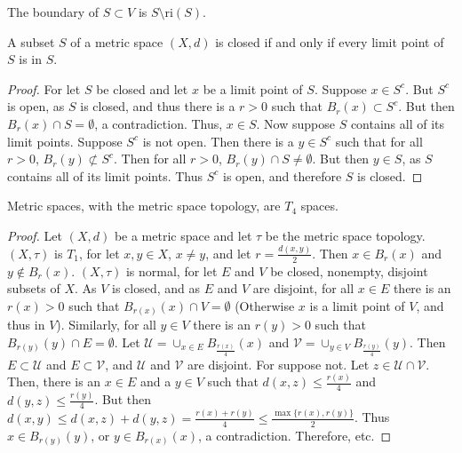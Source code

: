 \documentclass[crop=false,class=article,oneside]{standalone}
\begin{document}
            \begin{definition}
            The boundary of $S\subset V$ is $S\setminus \textrm{ri}(S)$.
            \end{definition}
            \begin{theorem}
            A subset $S$ of a metric space $(X,d)$ is closed if and only if every limit point of $S$ is in $S$.
            \end{theorem}
            \begin{proof}
            For let $S$ be closed and let $x$ be a limit point of $S$. Suppose $x\in S^c$. But $S^c$ is open, as $S$ is closed, and thus there is a $r>0$ such that $B_{r}(x)\subset S^c$. But then $B_{r}(x)\cap S = \emptyset$, a contradiction. Thus, $x\in S$. Now suppose $S$ contains all of its limit points. Suppose $S^c$ is not open. Then there is a $y\in S^c$ such that for all $r>0$, $B_{r}(y)\not \subset S^c$. Then for all $r>0$, $B_{r}(y)\cap S \ne \emptyset$. But then $y\in S$, as $S$ contains all of its limit points. Thus $S^c$ is open, and therefore $S$ is closed.
            \end{proof}
            \begin{theorem}
            Metric spaces, with the metric space topology, are $T_4$ spaces.
            \end{theorem}
            \begin{proof}
            Let $(X,d)$ be a metric space and let $\tau$ be the metric space topology. $(X,\tau)$ is $T_1$, for let $x,y\in X$, $x\ne y$, and let $r= \frac{d(x,y)}{2}$. Then $x\in B_{r}(x)$ and $y\notin B_{r}(x)$. $(X,\tau)$ is normal, for let $E$ and $V$ be closed, nonempty, disjoint subsets of $X$. As $V$ is closed, and as $E$ and $V$ are disjoint, for all $x\in E$ there is an $r(x)>0$ such that $B_{r(x)}(x)\cap V = \emptyset$ (Otherwise $x$ is a limit point of $V$, and thus in $V$). Similarly, for all $y\in V$ there is an $r(y)>0$ such that $B_{r(y)}(y)\cap E = \emptyset$. Let $\mathcal{U} = \cup_{x\in E}B_{\frac{r(x)}{4}}(x)$ and $\mathcal{V} = \cup_{y\in V}B_{\frac{r(y)}{4}}(y)$. Then $E\subset \mathcal{U}$ and $E\subset \mathcal{V}$, and $\mathcal{U}$ and $\mathcal{V}$ are disjoint. For suppose not. Let $z\in \mathcal{U}\cap \mathcal{V}$. Then, there is an $x\in E$ and a $y\in V$ such that $d(x,z)\leq \frac{r(x)}{4}$ and $d(y,z)\leq \frac{r(y)}{4}$. But then $d(x,y) \leq d(x,z)+d(y,z) = \frac{r(x)+r(y)}{4} \leq \frac{\max\{r(x),r(y)\}}{2}$. Thus $x\in B_{r(y)}(y)$, or $y\in B_{r(x)}(x)$, a contradiction. Therefore, etc.
            \end{proof}
\end{document}
